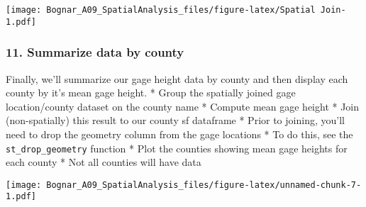 \documentclass[]{article}
\newenvironment{Shaded}{\begin{snugshade}}{\end{snugshade}}
\newcommand{\KeywordTok}[1]{\textcolor[rgb]{0.13,0.29,0.53}{\textbf{#1}}}
\newcommand{\DataTypeTok}[1]{\textcolor[rgb]{0.13,0.29,0.53}{#1}}
\newcommand{\DecValTok}[1]{\textcolor[rgb]{0.00,0.00,0.81}{#1}}
\newcommand{\StringTok}[1]{\textcolor[rgb]{0.31,0.60,0.02}{#1}}
\newcommand{\CommentTok}[1]{\textcolor[rgb]{0.56,0.35,0.01}{\textit{#1}}}
\newcommand{\OperatorTok}[1]{\textcolor[rgb]{0.81,0.36,0.00}{\textbf{#1}}}
\newcommand{\NormalTok}[1]{#1}
\begin{document}
\texttt{[image: Bognar\_A09\_SpatialAnalysis\_files/figure-latex/Spatial Join-1.pdf]}

\subsubsection{11. Summarize data by
county}\label{summarize-data-by-county}

Finally, we'll summarize our gage height data by county and then display
each county by it's mean gage height. * Group the spatially joined gage
location/county dataset on the county name * Compute mean gage height *
Join (non-spatially) this result to our county sf dataframe * Prior to
joining, you'll need to drop the geometry column from the gage locations
* To do this, see the \texttt{st\_drop\_geometry} function * Plot the
counties showing mean gage heights for each county * Not all counties
will have data

\begin{Shaded}
\end{Shaded}

\texttt{[image: Bognar\_A09\_SpatialAnalysis\_files/figure-latex/unnamed-chunk-7-1.pdf]}
\end{document}
